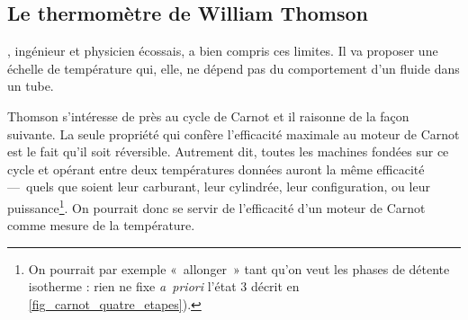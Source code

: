 	
	\subsection{Le thermomètre de William Thomson}
	
		, ingénieur et physicien écossais, a bien compris ces limites. Il va proposer une échelle de température qui, elle, ne dépend pas du comportement d’un fluide dans un tube.

		Thomson s’intéresse de près au cycle de Carnot et il raisonne de la façon suivante. La seule propriété qui confère l’efficacité maximale au moteur de Carnot est le fait qu’il soit réversible. Autrement dit, toutes les machines fondées sur ce cycle et opérant entre deux températures données auront la même efficacité —\ quels que soient leur carburant, leur cylindrée, leur configuration, ou leur puissance\footnote{On pourrait par exemple «~allonger~» tant qu’on veut les phases de détente isotherme : rien ne fixe \textit{a~priori} l’état 3 décrit en \cref{fig_carnot_quatre_etapes}).}. On pourrait donc se servir de l’efficacité d’un moteur de Carnot comme mesure de la température.
		
